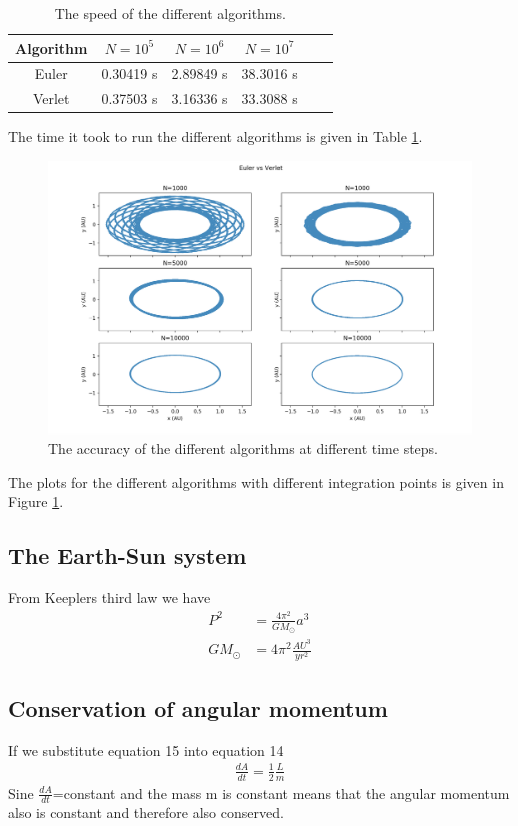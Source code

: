 \documentclass{article}
\begin{document}
\begin{multicols}{2}
\begin{table}[H]
\begin{center}
\begin{tabular}{  |c|c|c|c|c|c| } \hline
Algorithm&$N=10^5$&$N=10^6$&$N=10^7$ \\ \hline
Euler&0.30419 s&2.89849 s&38.3016 s\\ \hline
Verlet&0.37503 s&3.16336 s &33.3088 s \\ \hline
\end{tabular}
\caption{The speed of the different algorithms.}
\label{tab:Algo_N}
\end{center}
\end{table}

The time it took to run the different algorithms is given in Table \ref{tab:Algo_N}.

\begin{figure}[H]
	\centering
	\includegraphics[width=\linewidth]{Acc}
	\caption{The accuracy of the different algorithms at different time steps.}
	\label{fig:Acc}
\end{figure}

The plots for the different algorithms with different integration points is given in Figure \ref{fig:Acc}.

\subsection{The Earth-Sun system}
From Keeplers third law we have
\begin{align}
    P^2&=\frac{4\pi^2}{GM_\odot}a^3\\
    GM_\odot&=4\pi^2\frac{AU^3}{yr^2}
\end{align}
\subsection{Conservation of angular momentum}
If we substitute equation 15 into equation 14 
\begin{align}
    \frac{dA}{dt}=\frac{1}{2}\frac{L}{m}
\end{align}
Sine $\frac{dA}{dt}$=constant and the mass m is constant means that the angular momentum also is constant and therefore also conserved.  
\\

\end{multicols}
\end{document}
